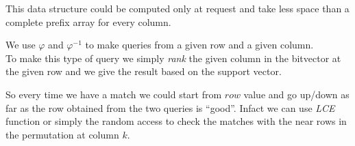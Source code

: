 \documentclass{beamer}
\begin{document}
\begin{frame}
   {
    \begin{block}{}
      This data structure could be computed only at request and take less space
      than a complete prefix array for every column.
    \end{block}
    \begin{block}{}
      We use $\varphi$ and $\varphi^{-1}$ to make queries from a given row and a
      given column.\\
      To make this type of query we simply \textit{rank} the given column in the
      bitvector at the given row and we give the result based on the support
      vector.
    \end{block}
    \begin{block}{}
      So every time we have a match we could start from $row$ value and go
      up/down as far as the row obtained from the two queries is
      ``good''. Infact we can use
      \textit{LCE} function or simply the random access to check the matches
      with the near rows in the permutation at column $k$.
    \end{block}
  }
\end{frame}
%   
%   
\end{document}
